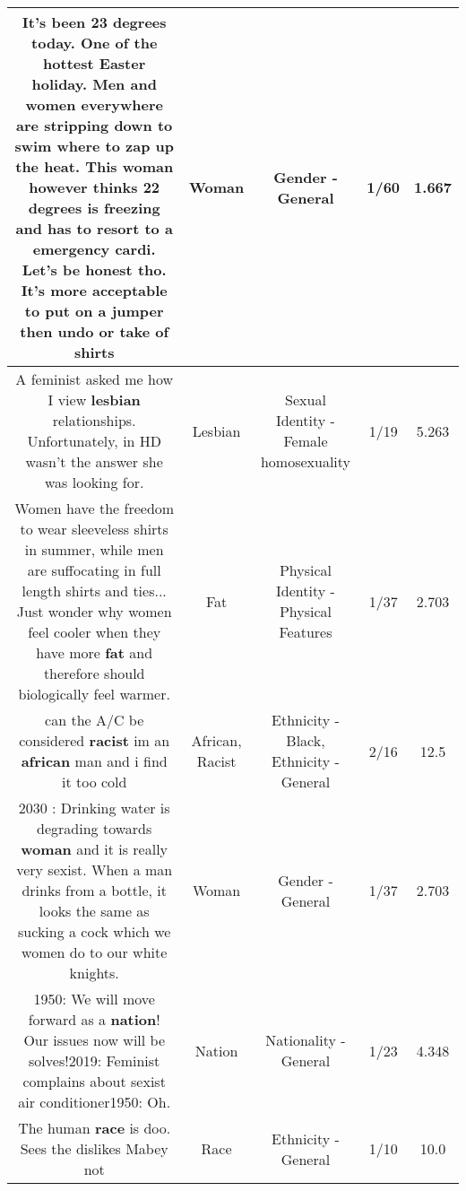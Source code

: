 \documentclass[11pt]{article}
\newlength\mylength
\begin{document}
\begin{center}
\begin{longtable}{|C{.65\mylength}|C{.30\mylength}|C{.12\mylength}|C{.12\mylength}|C{.12\mylength}|}
  \small It's been 23 degrees today.  One of the hottest Easter holiday.  Men and women everywhere are stripping down to swim where to zap up the heat.  This \textbf{woman} however thinks 22 degrees is freezing and has to resort to a emergency cardi.  Let's be honest tho.  It's more acceptable to put on a jumper then undo or take of shirts\normalsize   & Woman & Gender - General & 1/60 & 1.667 \\  \hline
  \small A feminist asked me how I view \textbf{lesbian} relationships. Unfortunately, in HD wasn't the answer she was looking for.\normalsize   & Lesbian & Sexual Identity - Female homosexuality & 1/19 & 5.263 \\  \hline
  \small Women have the freedom to wear sleeveless shirts in summer, while men are suffocating in full length shirts and ties... Just wonder why women feel cooler when they have more \textbf{fat} and therefore should biologically feel warmer.\normalsize   & Fat & Physical Identity - Physical Features & 1/37 & 2.703 \\  \hline
  \small can the A/C be considered \textbf{racist} im an \textbf{african} man and i find it too cold\normalsize   & African, Racist & Ethnicity - Black, Ethnicity - General & 2/16 & 12.5 \\  \hline
  \small 2030 : Drinking water is degrading towards \textbf{woman} and it is really very sexist. When a man drinks from a bottle, it looks the same as sucking a cock which we women do to our white knights.\normalsize   & Woman & Gender - General & 1/37 & 2.703 \\  \hline
  \small 1950: We will move forward as a \textbf{nation}! Our issues now will be solves!2019: Feminist complains about sexist air conditioner1950: Oh.\normalsize   & Nation & Nationality - General & 1/23 & 4.348 \\  \hline
  \small The human \textbf{race} is doo. Sees the dislikes Mabey not\normalsize   & Race & Ethnicity - General & 1/10 & 10.0 \\  \hline

\end{longtable}
\end{center}
\end{document}
